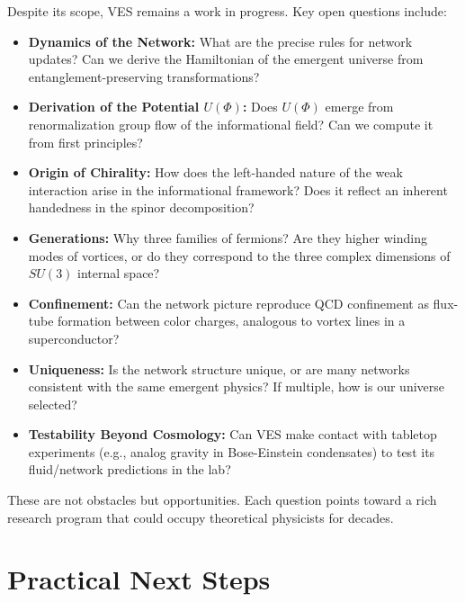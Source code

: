 \documentclass[12pt,a4paper]{book}
\begin{document}
Despite its scope, VES remains a work in progress. Key open questions include:
\begin{itemize}
    \item \textbf{Dynamics of the Network:} What are the precise rules for network updates? Can we derive the Hamiltonian of the emergent universe from entanglement-preserving transformations?
    \item \textbf{Derivation of the Potential $U(\Phi)$:} Does $U(\Phi)$ emerge from renormalization group flow of the informational field? Can we compute it from first principles?
    \item \textbf{Origin of Chirality:} How does the left-handed nature of the weak interaction arise in the informational framework? Does it reflect an inherent handedness in the spinor decomposition?
    \item \textbf{Generations:} Why three families of fermions? Are they higher winding modes of vortices, or do they correspond to the three complex dimensions of $SU(3)$ internal space?
    \item \textbf{Confinement:} Can the network picture reproduce QCD confinement as flux-tube formation between color charges, analogous to vortex lines in a superconductor?
    \item \textbf{Uniqueness:} Is the network structure unique, or are many networks consistent with the same emergent physics? If multiple, how is our universe selected?
    \item \textbf{Testability Beyond Cosmology:} Can VES make contact with tabletop experiments (e.g., analog gravity in Bose-Einstein condensates) to test its fluid/network predictions in the lab?
\end{itemize}
These are not obstacles but opportunities. Each question points toward a rich research program that could occupy theoretical physicists for decades.

\section{Practical Next Steps}
\end{document}
